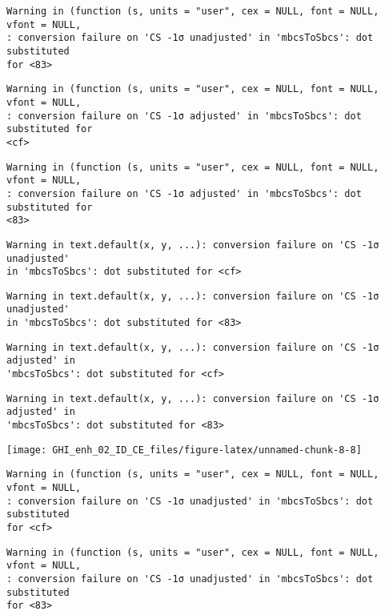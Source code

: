\documentclass[
  10pt,
  a4paper,oneside]{article}
\begin{document}
\begin{verbatim}
Warning in (function (s, units = "user", cex = NULL, font = NULL, vfont = NULL,
: conversion failure on 'CS -1σ unadjusted' in 'mbcsToSbcs': dot substituted
for <83>
\end{verbatim}

\begin{verbatim}
Warning in (function (s, units = "user", cex = NULL, font = NULL, vfont = NULL,
: conversion failure on 'CS -1σ adjusted' in 'mbcsToSbcs': dot substituted for
<cf>
\end{verbatim}

\begin{verbatim}
Warning in (function (s, units = "user", cex = NULL, font = NULL, vfont = NULL,
: conversion failure on 'CS -1σ adjusted' in 'mbcsToSbcs': dot substituted for
<83>
\end{verbatim}

\begin{verbatim}
Warning in text.default(x, y, ...): conversion failure on 'CS -1σ unadjusted'
in 'mbcsToSbcs': dot substituted for <cf>
\end{verbatim}

\begin{verbatim}
Warning in text.default(x, y, ...): conversion failure on 'CS -1σ unadjusted'
in 'mbcsToSbcs': dot substituted for <83>
\end{verbatim}

\begin{verbatim}
Warning in text.default(x, y, ...): conversion failure on 'CS -1σ adjusted' in
'mbcsToSbcs': dot substituted for <cf>
\end{verbatim}

\begin{verbatim}
Warning in text.default(x, y, ...): conversion failure on 'CS -1σ adjusted' in
'mbcsToSbcs': dot substituted for <83>
\end{verbatim}

\begin{center}\texttt{[image: GHI\_enh\_02\_ID\_CE\_files/figure-latex/unnamed-chunk-8-8]} \end{center}

\begin{verbatim}
Warning in (function (s, units = "user", cex = NULL, font = NULL, vfont = NULL,
: conversion failure on 'CS -1σ unadjusted' in 'mbcsToSbcs': dot substituted
for <cf>
\end{verbatim}

\begin{verbatim}
Warning in (function (s, units = "user", cex = NULL, font = NULL, vfont = NULL,
: conversion failure on 'CS -1σ unadjusted' in 'mbcsToSbcs': dot substituted
for <83>
\end{verbatim}
\end{document}
